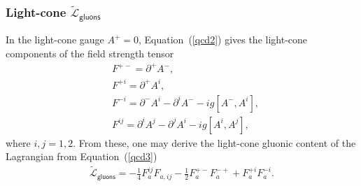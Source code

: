 \subsubsection*{Light-cone $\widetilde{\mathcal{L}}_{\textsf{gluons}}$}
In the light-cone gauge $A^+=0$, Equation~(\cref{qcd2}) gives the light-cone components of the field strength tensor
\begin{equation}\label{lc28}
\begin{aligned}
&F^{+-}=\partial^+A^-,\\
&F^{+i}=\partial^+A^i,\\
&F^{-i}=\partial^-A^i-\partial^iA^--ig[A^-,A^i],\\
&F^{ij}=\partial^iA^j-\partial^jA^i-ig[A^i,A^j],
\end{aligned}
\end{equation}
where $i,j=1,2$. From these, one may derive the light-cone gluonic content of the Lagrangian from Equation~(\cref{qcd3})
\begin{align}\label{lc38}
\widetilde{\mathcal{L}}_{\textsf{gluons}}=-\frac{1}{4}F^{ij}_aF_{a,ij}-\frac{1}{2}F^{+-}_aF^{-+}_a+F_a^{+i}F_a^{-i}.
\end{align}

